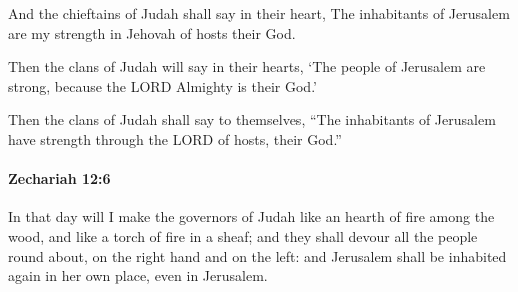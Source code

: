			\begin{versebox}
					\item[BHS] 
					\item[LXX] 
					\item[ASV] And the chieftains of Judah shall say in their heart, The inhabitants of Jerusalem are my strength in Jehovah of hosts their God.
					\item[NIV] Then the clans of Judah will say in their hearts, ‘The people of Jerusalem are strong, because the LORD Almighty is their God.’
					\item[NRSV] Then the clans of Judah shall say to themselves, “The inhabitants of Jerusalem have strength through the LORD of hosts, their God.”
			\end{versebox}

		\paragraph{Zechariah 12:6} %
			\label{ZECHARIAH-12-6}

			In that day will I make the governors of Judah like an hearth of fire among the wood, and like a torch of fire in a sheaf; and they shall devour all the people round about, on the right hand and on the left: and Jerusalem shall be inhabited again in her own place, even in Jerusalem.

